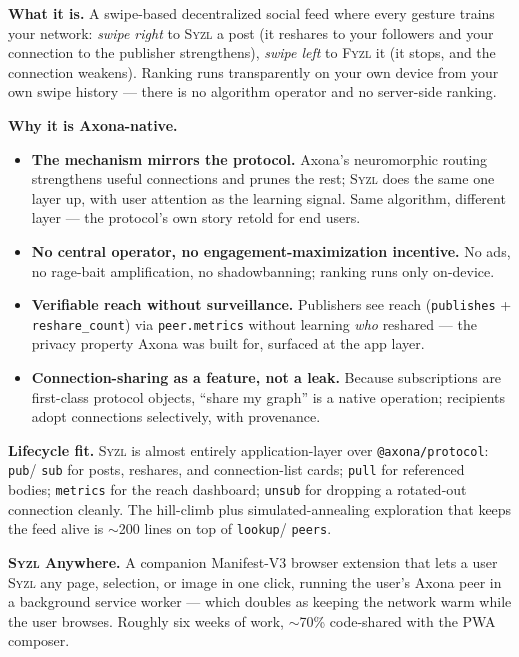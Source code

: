 \documentclass[nobib]{tufte-handout}
\begin{document}
\textbf{What it is.} A swipe-based decentralized social feed where every
gesture trains your network: \emph{swipe right} to \textsc{Syzl} a post
(it reshares to your followers and your connection to the publisher
strengthens), \emph{swipe left} to \textsc{Fyzl} it (it stops, and the
connection weakens). Ranking runs transparently on your own device from
your own swipe history --- there is no algorithm operator and no
server-side ranking.

\textbf{Why it is Axona-native.}

\begin{itemize}
\item \textbf{The mechanism mirrors the protocol.} Axona's
neuromorphic routing strengthens useful connections and prunes the
rest; \textsc{Syzl} does the same one layer up, with user attention as
the learning signal. Same algorithm, different layer --- the protocol's
own story retold for end users.
\item \textbf{No central operator, no engagement-maximization
incentive.} No ads, no rage-bait amplification, no shadowbanning;
ranking runs only on-device.
\item \textbf{Verifiable reach without surveillance.} Publishers see
reach (\texttt{publishes} + \texttt{reshare\_count}) via
\texttt{peer.metrics} without learning \emph{who} reshared --- the
privacy property Axona was built for, surfaced at the app layer.
\item \textbf{Connection-sharing as a feature, not a leak.} Because
subscriptions are first-class protocol objects, ``share my graph'' is a
native operation; recipients adopt connections selectively, with
provenance.
\end{itemize}

\textbf{Lifecycle fit.} \textsc{Syzl} is almost entirely
application-layer over \texttt{@axona/protocol}: \texttt{pub}/%
\texttt{sub} for posts, reshares, and connection-list cards;
\texttt{pull} for referenced bodies; \texttt{metrics} for the reach
dashboard; \texttt{unsub} for dropping a rotated-out connection
cleanly. The hill-climb plus simulated-annealing exploration that keeps
the feed alive is $\sim$200 lines on top of \texttt{lookup}/%
\texttt{peers}.

\textbf{\textsc{Syzl} Anywhere.} A companion Manifest-V3 browser
extension that lets a user \textsc{Syzl} any page, selection, or image
in one click, running the user's Axona peer in a background service
worker --- which doubles as keeping the network warm while the user
browses. Roughly six weeks of work, $\sim$70\% code-shared with the PWA
composer.
\end{document}
